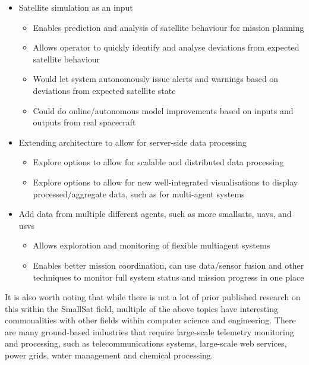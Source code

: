 \begin{itemize}
    \item Satellite simulation as an input
    \begin{itemize}
      \item Enables prediction and analysis of satellite behaviour for mission planning
      \item Allows operator to quickly identify and analyse deviations from expected satellite behaviour
      \item Would let system autonomously issue alerts and warnings based on deviations from expected satellite state
      \item Could do online/autonomous model improvements based on inputs and outputs from real spacecraft
    \end{itemize}
    \item Extending architecture to allow for server-side data processing
    \begin{itemize}
      \item Explore options to allow for scalable and distributed data processing
      \item Explore options to allow for new well-integrated visualisations to display processed/aggregate data, such as for multi-agent systems
    \end{itemize}
    \item Add data from multiple different agents, such as more \Gls{smallsat}s, \Gls{uav}s, and \Gls{usv}s
    \begin{itemize}
      \item Allows exploration and monitoring of flexible multiagent systems
      \item Enables better mission coordination, can use data/sensor fusion and other techniques to monitor full system status and mission progress in one place
    \end{itemize}
\end{itemize}

It is also worth noting that while there is not a lot of prior published research on this within the SmallSat field, multiple of the above topics have interesting commonalities with other fields within computer science and engineering. There are many ground-based industries that require large-scale telemetry monitoring and processing, such as telecommunications systems, large-scale web services, power grids, water management and chemical processing.